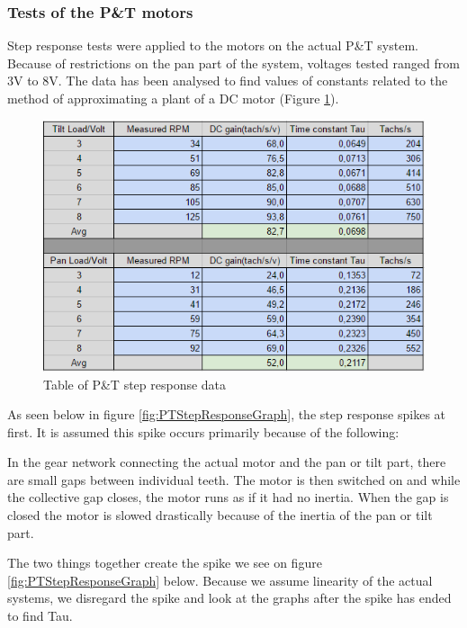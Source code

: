 \subsubsection{Tests of the P\&T motors}
Step response tests were applied to the motors on the actual P\&T system. Because of restrictions on the pan part of the system, voltages tested ranged from 3V to 8V. The data has been analysed to find values of constants related to the method of approximating a plant of a DC motor (Figure \ref{fig:PanTiltStepDataTable}).

\begin{figure}[h!]
\centering
\includegraphics[scale=0.6]{Billeder/PanTiltStepDataTable.png}
\caption{Table of P\&T step response data}
\label{fig:PanTiltStepDataTable}
\end{figure}

As seen below in figure \ref{fig:PTStepResponseGraph}, the step response spikes at first. It is assumed this spike occurs primarily because of the following:

In the gear network connecting the actual motor and the pan or tilt part, there are small gaps between individual teeth. The motor is then switched on and while the collective gap closes, the motor runs as if it had no inertia. When the gap is closed the motor is slowed drastically because of the inertia of the pan or tilt part. 

The two things together create the spike we see on figure \ref{fig:PTStepResponseGraph} below. Because we assume linearity of the actual systems, we disregard the spike and look at the graphs after the spike has ended to find Tau.

